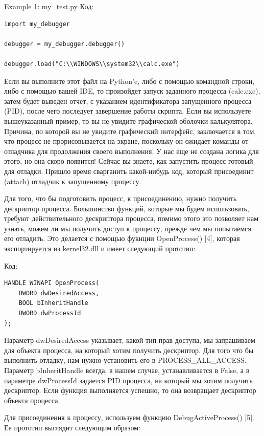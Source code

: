 \documentclass[12pt]{book}
\begin{document}
Example 1: my\_test.py
Код:
\begin{lstlisting}
import my_debugger

debugger = my_debugger.debugger()

debugger.load("C:\\WINDOWS\\system32\\calc.exe")
\end{lstlisting}

Если вы выполните этот файл на Python’e, либо с помощью командной строки, либо с помощью вашей IDE, то произойдет запуск заданного процесса (calc.exe), затем будет выведен отчет, с указанием идентификатора запущенного процесса (PID), после чего последует завершение работы скрипта. Если вы используете вышеуказанный пример, то вы не увидите графической оболочки калькулятора. Причина, по которой вы не увидите графический интерфейс, заключается в том, что процесс не прорисовывается на экране, поскольку он ожидает команды от отладчика для продолжения своего выполнения. У нас еще не создана логика для этого, но она скоро появится! Сейчас вы знаете, как запустить процесс готовый для отладки. Пришло время сварганить какой-нибудь код, который присоединит (attach) отладчик к запущенному процессу.

Для того, что бы подготовить процесс, к присоединению, нужно получить дескриптор процесса. Большинство функций, которые мы будем использовать, требуют действительного дескриптора процесса, помимо этого это позволяет нам узнать, можем ли мы получить доступ к процессу, прежде чем мы попытаемся его отладить. Это делается с помощью фукнции OpenProcess() [4], которая экспортируется из kernel32.dll и имеет следующий прототип:

Код:
\begin{lstlisting}
HANDLE WINAPI OpenProcess(
    DWORD dwDesiredAccess,
    BOOL bInheritHandle
    DWORD dwProcessId
);
\end{lstlisting}

Параметр dwDesiredAccess указывает, какой тип прав доступа, мы запрашиваем для объекта процесса, на который хотим получить дескриптор. Для того что бы выполнить отладку, нам нужно установить его в PROCESS\_ALL\_ACCESS. Параметр bInheritHandle всегда, в нашем случае, устанавливается в False, а в параметре dwProcessId задается PID процесса, на который мы хотим получить дескриптор. Если функция выполняется успешно, то она возвращает дескриптор объекта процесса.

Для присоединения к процессу, используем функцию DebugActiveProcess() [5]. Ее прототип выглядит следующим образом:
\end{document}
